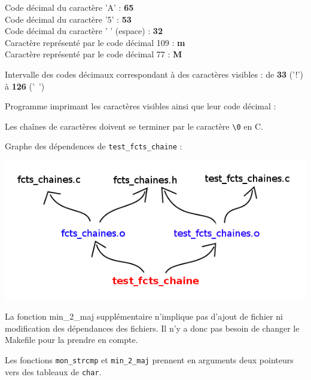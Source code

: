 \documentclass[10pt]{article}
\begin{document}
\begin{enumerate}[label=\textbf{[\alph*]}]
  \setlength\itemsep{1em}
\item Code décimal du caractère 'A' : \textbf{65} \\
  Code décimal du caractère '5' : \textbf{53} \\
  Code décimal du caractère ' ' (espace) : \textbf{32} \\
  Caractère représenté par le code décimal 109 : \textbf{m} \\
  Caractère représenté par le code décimal 77 : \textbf{M}

\item Intervalle des codes décimaux correspondant à des caractères
  visibles : de \textbf{33} ('!') à \textbf{126} ('~')

\item Programme imprimant les caractères visibles ainsi que
  leur code décimal :

  

\item Les chaînes de caractères doivent se terminer par le
  caractère \verb|\0| en C.

\item Graphe des dépendences de \texttt{test\_fcts\_chaine} :
  \begin{center}
    \includegraphics[scale=0.5]{graphe_dep.png}
  \end{center}

\item La fonction min\_2\_maj supplémentaire n'implique pas d'ajout
  de fichier ni modification des dépendances des fichiers. Il n'y a
  donc pas besoin de changer le Makefile pour la prendre en compte.

\newpage

\item Les fonctions \texttt{mon\_strcmp} et \texttt{min\_2\_maj}
  prennent en arguments deux pointeurs vers des tableaux de
  \texttt{char}.


\end{enumerate}
\end{document}
